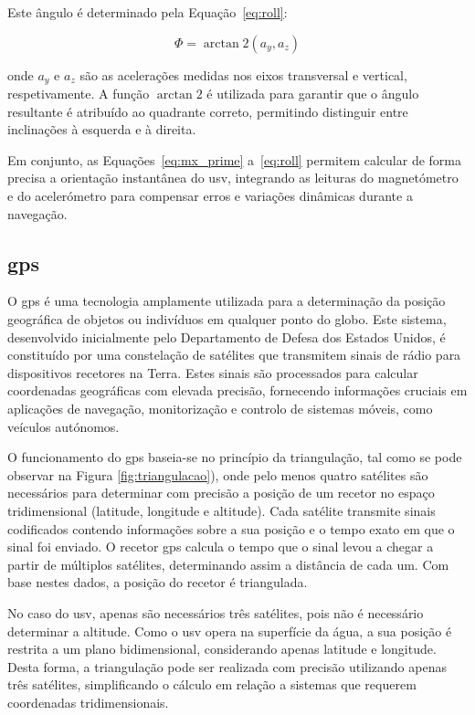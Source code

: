 Este ângulo é determinado pela Equação~\ref{eq:roll}:

\begin{equation}
    \Phi = \arctan2(a_y, a_z)
    \label{eq:roll}
\end{equation}

onde \(a_y\) e \(a_z\) são as acelerações medidas nos eixos transversal e vertical, respetivamente. A função \(\arctan2\) é utilizada para garantir que o ângulo resultante é atribuído ao quadrante correto, permitindo distinguir entre inclinações à esquerda e à direita.  

Em conjunto, as Equações~\ref{eq:mx_prime} a~\ref{eq:roll} permitem calcular de forma precisa a orientação instantânea do \gls{usv}, integrando as leituras do magnetómetro e do acelerómetro para compensar erros e variações dinâmicas durante a navegação.

\subsection{\acrfull{gps}}
\label{subsec:gps}

O \gls{gps} é uma tecnologia amplamente utilizada para a determinação da posição geográfica de objetos ou indivíduos em qualquer ponto do globo. Este sistema, desenvolvido inicialmente pelo Departamento de Defesa dos Estados Unidos, é constituído por uma constelação de satélites que transmitem sinais de rádio para dispositivos recetores na Terra. Estes sinais são processados para calcular coordenadas geográficas com elevada precisão, fornecendo informações cruciais em aplicações de navegação, monitorização e controlo de sistemas móveis, como veículos autónomos.

O funcionamento do \gls{gps} baseia-se no princípio da triangulação, tal como se pode observar na Figura \ref{fig:triangulacao}), onde pelo menos quatro satélites são necessários para determinar com precisão a posição de um recetor no espaço tridimensional (latitude, longitude e altitude). Cada satélite transmite sinais codificados contendo informações sobre a sua posição e o tempo exato em que o sinal foi enviado. O recetor \gls{gps} calcula o tempo que o sinal levou a chegar a partir de múltiplos satélites, determinando assim a distância de cada um. Com base nestes dados, a posição do recetor é triangulada. 

No caso do \gls{usv}, apenas são necessários três satélites, pois não é necessário determinar a altitude. Como o \gls{usv} opera na superfície da água, a sua posição é restrita a um plano bidimensional, considerando apenas latitude e longitude. Desta forma, a triangulação pode ser realizada com precisão utilizando apenas três satélites, simplificando o cálculo em relação a sistemas que requerem coordenadas tridimensionais.

